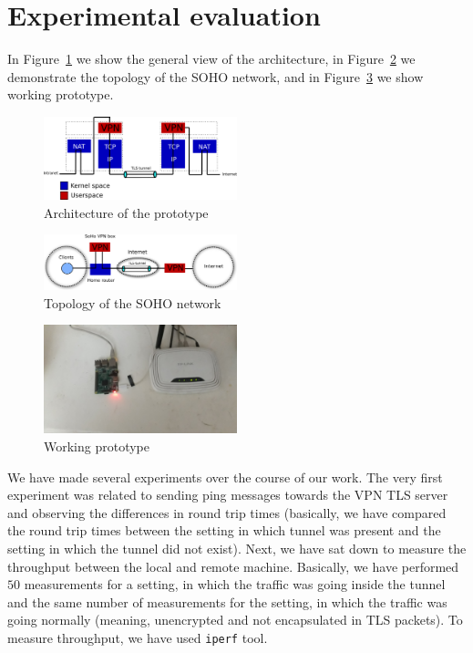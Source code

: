 \section{Experimental evaluation}
\label{section:experiments}



In Figure~\ref{fig:arch} we show the general view of the architecture, 
in Figure~\ref{fig:topo} we demonstrate the topology of the SOHO network, and in 
Figure~\ref{fig:prototype} we show working prototype.

\begin{figure}[!h]
        \includegraphics[width=0.5\textwidth]{graphics/architecture.png}
        \caption{Architecture of the prototype}
        \label{fig:arch}
\end{figure}

\begin{figure}[!h]
        \includegraphics[width=0.5\textwidth]{graphics/topology.png}
        \caption{Topology of the SOHO network}
        \label{fig:topo}
\end{figure}

\begin{figure}[!h]
        \includegraphics[width=0.5\textwidth]{graphics/prototype.jpg}
        \caption{Working prototype}
        \label{fig:prototype}
\end{figure}

We have made several experiments over the course of our work. The very first experiment was 
related to sending ping messages towards the VPN TLS server and observing the differences in
round trip times (basically, we have compared the round trip times between the setting in 
which tunnel was present and the setting in which the tunnel did not exist). Next, we have
sat down to measure the throughput between the local and remote machine. Basically, we have 
performed $50$ measurements for a setting, in which the traffic was going inside the tunnel
and the same number of measurements for the setting, in which the traffic was going 
normally (meaning, unencrypted and not encapsulated in TLS packets). To measure throughput,
we have used \texttt{iperf} tool.

